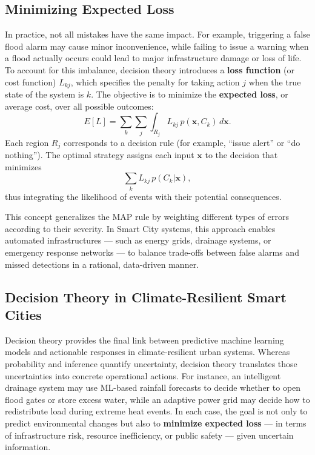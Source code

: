 \documentclass[12pt]{article}
\begin{document}
\subsection{Minimizing Expected Loss}

In practice, not all mistakes have the same impact. 
For example, triggering a false flood alarm may cause minor inconvenience, while failing to issue a warning when a flood 
actually occurs could lead to major infrastructure damage or loss of life. 
To account for this imbalance, decision theory introduces a \textbf{loss function} (or cost function) \( L_{kj} \), which 
specifies the penalty for taking action \( j \) when the true state of the system is \( k \). 
The objective is to minimize the \textbf{expected loss}, or average cost, over all possible outcomes:
\[
E[L] = \sum_{k} \sum_{j} \int_{R_j} L_{kj}\, p(\mathbf{x}, C_k)\, d\mathbf{x}.
\]
Each region \( R_j \) corresponds to a decision rule (for example, “issue alert” or “do nothing”). 
The optimal strategy assigns each input \( \mathbf{x} \) to the decision that minimizes
\[
\sum_{k} L_{kj}\, p(C_k | \mathbf{x}),
\]
thus integrating the likelihood of events with their potential consequences.

This concept generalizes the MAP rule by weighting different types of errors according to their severity. 
In Smart City systems, this approach enables automated infrastructures — such as energy grids, drainage systems, 
or emergency response networks — to balance trade-offs between false alarms and missed detections in a rational, data-driven manner.

\subsection{Decision Theory in Climate-Resilient Smart Cities}

Decision theory provides the final link between predictive machine learning models and actionable responses in climate-resilient 
urban systems. 
Whereas probability and inference quantify uncertainty, decision theory translates those uncertainties into concrete operational actions. 
For instance, an intelligent drainage system may use ML-based rainfall forecasts to decide whether to open flood gates or store 
excess water, while an adaptive power grid may decide how to redistribute load during extreme heat events. 
In each case, the goal is not only to predict environmental changes but also to \textbf{minimize expected loss} — 
in terms of infrastructure risk, resource inefficiency, or public safety — given uncertain information.
\end{document}
